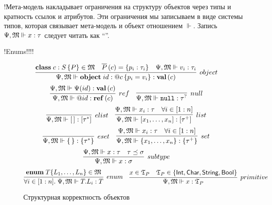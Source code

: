 !Мета-модель накладывает ограничения на структуру объектов через типы и кратность ссылок и атрибутов. Эти ограничения мы записываем в виде системы типов, которая связывает мета-модель и объект отношением $\Vdash$. Запись $\Psi, \mathfrak{M} \Vdash x : \tau$ следует читать как ``''.

!Enums!!!!

\begin{figure}[htbp]
	\centering
$$
	\infer[object]{
		\fromMM \Object{id}{\Ref{c}}{p_i = v_i} : \ClassT{c}
	}{
		\Class{c}{S}{P} \in \MM{M}&
		\AllProps{c} = \{p_i : \tau_i\}&
		\fromMM v_i : \tau_i
	}
$$
$$
\infer[ref]{
	\fromMM \Ref{id} : \RefT{c}
}{
	\fromMM \RContext(id) : \ClassT{c}
}
\quad
\infer[null]{
	\fromMM \Null : \NullableT{\tau}
}{}
$$
$$
\infer[elist]{
	\fromMM \List{\,} : \ListT{\tau^*}
}{}
\quad
\infer[list]{
	\fromMM \List{x_1, \ldots, x_n} : \List{\tau^+}
}{
	\fromMM x_i : \tau & \forall i\in[1:n]
}
$$
$$
\infer[eset]{
	\fromMM \Set{\,} : \SetT{\tau^*}
}{}
\quad
\infer[set]{
	\fromMM \Set{x_1, \ldots, x_n} : \SetT{\tau^+}
}{
	\fromMM x_i : \tau & \forall i\in[1:n]
}
$$
$$
\infer[subtype]{
	\fromMM x : \sigma
}{
	\fromMM x : \tau &
	\tau \subtype \sigma
}
$$
$$
\infer[enum]{
	\forall i \in [1:n]. \; \fromMM T.L_i : T
}{
	\mathbf{enum}\;T\{L_1,\ldots,L_n\} \in \MM{M}
}
\quad
\infer[primitive]{
	\fromMM x : \Types_P
}{
	x \in \Types_P & 
	\Types_P \in \{\IntegerT, \CharT, \StringT, \BooleanT\}
}
$$
	\caption{Структурная корректность объектов}\label{TypesMM}
\end{figure}


